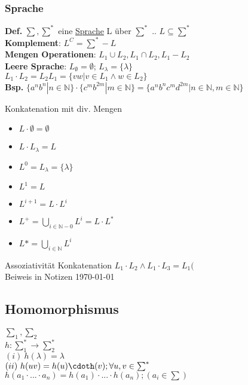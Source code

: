 \documentclass[a4paper,10pt]{article}
\begin{document}
\subsubsection{Sprache}
\textbf{Def.} $\sum,\sum^*$ eine \underline{Sprache} L über $\sum^*$ .. $L\subseteq\sum^*$\\[3pt]
\textbf{Komplement}: $L^C=\sum^*-L$\\[3pt]
\textbf{Mengen Operationen}: $L_1 \cup L_2, L_1\cap L_2, L_1-L_2$ \\[3pt]
\textbf{Leere Sprache}: $L_{\emptyset}=\emptyset$; $L_\lambda=\{\lambda\}$\\[3pt]
$L_1\cdot L_2 = L_2L_1=\{vw|v\in L_1 \wedge w\in L_2\}$\\[3pt]
\textbf{Bsp.} $\{a^nb^n|n\in\mathbb N\}\cdot\{c^mb^{2m}|m\in\mathbb N\}=\{a^nb^nc^md^{2m}|n\in\mathbb N, m\in \mathbb N\}$
\begin{bembox}
    {Konkatenation mit div. Mengen}
    \begin{itemize}
        \item     $L\cdot\emptyset=\emptyset$ 
        \item     $L\cdot L_\lambda=L$ 
        \item     $L^0=L_\lambda=\{\lambda\}$
        \item    $L^1=L$
        \item    $L^{i+1}=L\cdot L^i$
        \item $L^+=\displaystyle\bigcup_{i\in\mathbb N -{0}} L^i=L\cdot L^*$
        \item $L*=\displaystyle\bigcup_{i\in \mathbb N}L^i$
    \end{itemize}
\end{bembox}
\begin{tbox}
    {Assoziativität Konkatenation}
    $L_1\cdot L_2\wedge L_1\cdot L_3= L_1( $\\
    Beiweis in Notizen \today
\end{tbox}
\subsection{Homomorphismus}
$\sum_1, \sum_2$ \\[4pt]
$h:\sum_1^*\rightarrow\sum_2^*$\\[3pt]
$(i)\ h(\lambda)=\lambda$\\[3pt]
$(ii)\  h(uv)=h(u)\cdoth(v);\forall u,v\in\sum^*$\\[3pt]
$h(a_1\cdot...\cdot a_n)=h(a_1)\cdot ... \cdot h(a_n); (a_i\in\sum)$\\[3pt]
\end{document}
